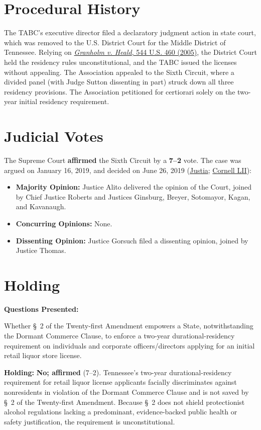 \documentclass[12pt]{article}
\begin{document}
\section{Procedural History}
The TABC's executive director filed a declaratory judgment action in state court, which was removed to the U.S. District Court for the Middle District of Tennessee. Relying on \href{https://supreme.justia.com/cases/federal/us/544/460/}{\textit{Granholm v. Heald}, 544 U.S. 460 (2005)}, the District Court held the residency rules unconstitutional, and the TABC issued the licenses without appealing. The Association appealed to the Sixth Circuit, where a divided panel (with Judge Sutton dissenting in part) struck down all three residency provisions. The Association petitioned for certiorari solely on the two-year initial residency requirement.

\section{Judicial Votes}
The Supreme Court \textbf{affirmed} the Sixth Circuit by a \textbf{7--2} vote. The case was argued on January 16, 2019, and decided on June 26, 2019 (\href{https://supreme.justia.com/cases/federal/us/588/18-96/}{Justia}; \href{https://www.law.cornell.edu/supremecourt/text/18-96}{Cornell LII}):

\begin{itemize}
    \item \textbf{Majority Opinion:} Justice Alito delivered the opinion of the Court, joined by Chief Justice Roberts and Justices Ginsburg, Breyer, Sotomayor, Kagan, and Kavanaugh.
    \item \textbf{Concurring Opinions:} None.
    \item \textbf{Dissenting Opinion:} Justice Gorsuch filed a dissenting opinion, joined by Justice Thomas.
\end{itemize}

\section{Holding}
\textbf{Questions Presented:}

Whether \S~2 of the Twenty-first Amendment empowers a State, notwithstanding the Dormant Commerce Clause, to enforce a two-year durational-residency requirement on individuals and corporate officers/directors applying for an initial retail liquor store license.

\textbf{Holding:} \textbf{No; affirmed} (7--2). Tennessee's two-year durational-residency requirement for retail liquor license applicants facially discriminates against nonresidents in violation of the Dormant Commerce Clause and is not saved by \S~2 of the Twenty-first Amendment. Because \S~2 does not shield protectionist alcohol regulations lacking a predominant, evidence-backed public health or safety justification, the requirement is unconstitutional.
\end{document}

